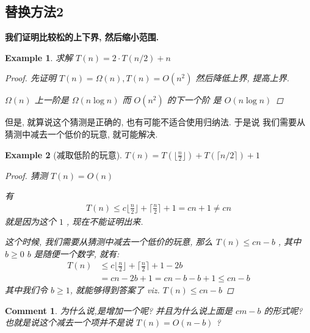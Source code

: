 \documentclass[a4paper, 10pt]{ctexart} %
\newtheorem{example}{Example}
\newtheorem{corollary}{Comment}
\begin{document}
    \subsection{替换方法2}
    \textbf{
    我们证明比较松的上下界, 然后缩小范围. 
    }
    \begin{example}
        求解 $T \left(n \right) = 2 \cdot  T \left( n /2\right) + n$ 
        \begin{proof}
            先证明 $T \left(n\right)  = \Omega (n   ) , T \left(n \right) =  O\left(n  ^{2} \right)$ 
            然后降低上界, 提高上界. 

            $\Omega\left(n\right) $ 上一阶是 $\Omega \left( n  \log n   \right)$ 而 
            $ O\left(n ^{2} \right)$ 的下一个阶 是 $ O \left(n \log n\right)$
        \end{proof}
    \end{example}
    但是, 就算说这个猜测是正确的, 也有可能不适合使用归纳法. 于是说 我们需要从猜测中减去一个低价的玩意, 就可能解决. 
    \begin{example}[减取低阶的玩意]
        $ T \left(n\right)   = T \left(\lfloor  \frac{n}{2}\rfloor \right) + T \left( \lceil n  / 2 \rceil\right)   +1$
        \begin{proof}
            猜测 $T \left(n\right)  =  O\left(n\right)$ 
            
            有 
            \begin{align*}
                 T\left(n\right)  \le c \lfloor \frac{n}{2} \rfloor + \lceil \frac{n}{2} \rceil + 1  = c n + 1 \ne c n 
            \end{align*}
            就是因为这个 $1$ , 现在不能证明出来.

           这个时候, 我们需要从猜测中减去一个低价的玩意, 那么 $T \left(n \right) \le cn - b $ ,
           其中 $ b \ge 0$ $b$ 是随便一个数字,
           就有:
           \begin{align*}
            T\left(n\right) &  \le c \lfloor \frac{n}{2} \rfloor + \lceil \frac{n}{2} \rceil + 1  - 2 b \\
            & = cn  -  2b + 1 = cn -  b  -  b+ 1 \le cn - b
           \end{align*}
           其中我们令 $b \ge 1$, 就能够得到答案了 viz. $T \left(n\right) \le c n - b$ 
        \end{proof}
    \end{example} 
\begin{corollary}
    为什么说,是增加一个呢? 
    并且为什么说上面是 $c m -  b$ 的形式呢? 
    也就是说这个减去一个项并不是说 $T \left(n  \right) = O\left( n  - b \right)$ ? 
\end{corollary}
\end{document}
